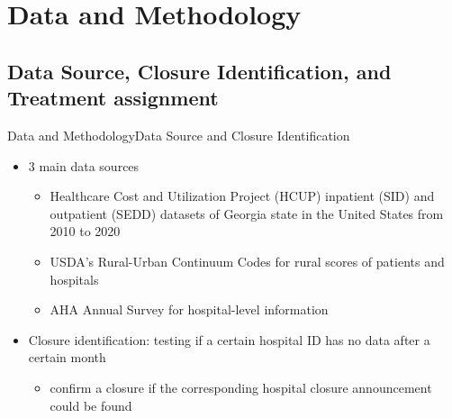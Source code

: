 \documentclass{beamer}
\theoremstyle{definition}
\begin{document}


\section{Data and Methodology}

\subsection{Data Source, Closure Identification, and Treatment assignment}


\begin{frame}{Data and Methodology}{Data Source and Closure Identification}

\begin{itemize}
\setlength{\itemsep}{12pt}
\item 3 main data sources
    \begin{itemize}
    \setlength{\itemsep}{7pt}
        \item Healthcare Cost and Utilization Project (HCUP) inpatient (SID) and outpatient (SEDD) datasets of Georgia state in the United States from 2010 to 2020
        \item USDA's Rural-Urban Continuum Codes for rural scores of patients and hospitals
        \item AHA Annual Survey for hospital-level information
    \end{itemize}
    \item Closure identification: testing if a certain hospital ID has no data after a certain month
    \begin{itemize}
    \setlength{\itemsep}{7pt}
        \item confirm a closure if the corresponding hospital closure announcement could be found
    \end{itemize}
\end{itemize}

\end{frame}
\end{document}
